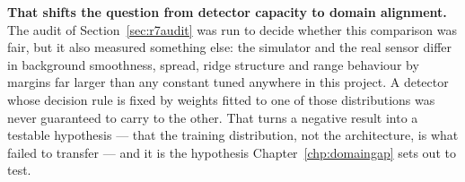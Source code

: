 \textbf{That shifts the question from detector capacity to domain alignment.} The audit of
Section~\ref{sec:r7audit} was run to decide whether this comparison was fair, but it also measured
something else: the simulator and the real sensor differ in background smoothness, spread, ridge
structure and range behaviour by margins far larger than any constant tuned anywhere in this
project. A detector whose decision rule is fixed by weights fitted to one of those distributions was
never guaranteed to carry to the other. That turns a negative result into a testable hypothesis ---
that the training distribution, not the architecture, is what failed to transfer --- and it is the
hypothesis Chapter~\ref{chp:domaingap} sets out to test.
